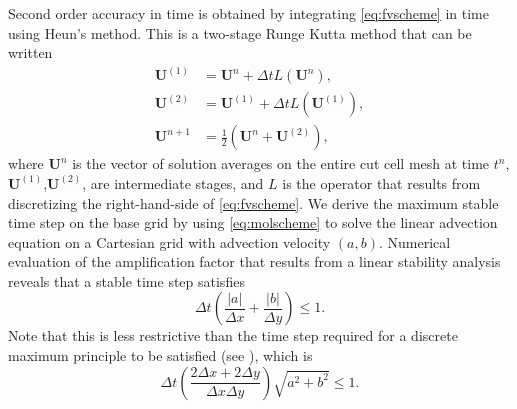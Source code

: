 Second order accuracy in time is obtained by integrating \eqref{eq:fvscheme} in time using Heun's method.  This is a two-stage Runge Kutta method that can be written
\begin{equation}\label{eq:molscheme}
\begin{aligned}
	\mathbf{U}^{(1)} &= \mathbf{U}^{n} + \Delta t L(\mathbf{U}^n), \\
	\mathbf{U}^{(2)} &= \mathbf{U}^{(1)} + \Delta t L(\mathbf{U}^{(1)}), \\
	\mathbf{U}^{n+1} &= \frac{1}{2}( \mathbf{U}^{n} + \mathbf{U}^{(2)} ) ,	
\end{aligned}
\end{equation}
where $\mathbf{U}^{n}$ is the vector of solution averages on the entire cut cell mesh at time $t^n$,
$\mathbf{U}^{(1)}$,$\mathbf{U}^{(2)}$, are intermediate stages, and $L$ is the operator that results
from discretizing the right-hand-side of \eqref{eq:fvscheme}.
We derive the maximum stable time step on the base grid by using \eqref{eq:molscheme} to solve the linear advection equation on a Cartesian grid with advection velocity $(a,b)$.
Numerical evaluation of the amplification factor that results from a linear stability analysis reveals that a stable time step satisfies
\begin{equation}\label{eq:vn1}
\Delta t   \left( \frac{|a|}{\Delta x} + \frac{|b|}{\Delta y} \right)\leq 1.
\end{equation}
Note that this is less restrictive than the time step required for a discrete maximum principle to be 
satisfied (see \cite{giuliani2018analysis}), which is 
\begin{equation}
\Delta t  \left( \frac{2\Delta x + 2 \Delta y}{\Delta x \Delta y} \right) \sqrt{a^2 + b^2}\leq 1 .
\end{equation}


